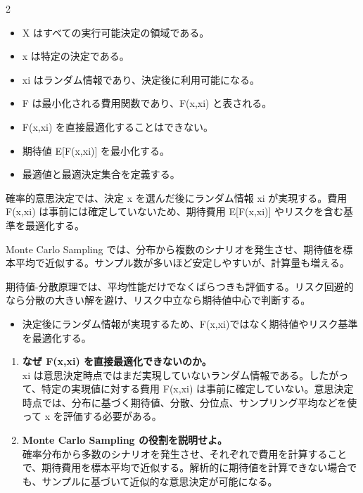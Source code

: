 \clearpage
{}
\begin{multicols}{2}\footnotesize\raggedcolumns
{}
\begin{itemize}
\item X はすべての実行可能決定の領域である。
\item x は特定の決定である。
\item xi はランダム情報であり、決定後に利用可能になる。
\item F は最小化される費用関数であり、F(x,xi) と表される。
\item F(x,xi) を直接最適化することはできない。
\item 期待値 E[F(x,xi)] を最小化する。
\item 最適値と最適決定集合を定義する。
\end{itemize}
確率的意思決定では、決定 x を選んだ後にランダム情報 xi が実現する。費用 F(x,xi) は事前には確定していないため、期待費用 E[F(x,xi)] やリスクを含む基準を最適化する。\par

Monte Carlo Sampling では、分布から複数のシナリオを発生させ、期待値を標本平均で近似する。サンプル数が多いほど安定しやすいが、計算量も増える。\par

期待値-分散原理では、平均性能だけでなくばらつきも評価する。リスク回避的なら分散の大きい解を避け、リスク中立なら期待値中心で判断する。\par
{}
\begin{itemize}
\item 決定後にランダム情報が実現するため、F(x,xi)ではなく期待値やリスク基準を最適化する。
\end{itemize}
\begin{enumerate}
\item \textbf{なぜ F(x,xi) を直接最適化できないのか。}\\xi は意思決定時点ではまだ実現していないランダム情報である。したがって、特定の実現値に対する費用 F(x,xi) は事前に確定していない。意思決定時点では、分布に基づく期待値、分散、分位点、サンプリング平均などを使って x を評価する必要がある。
\item \textbf{Monte Carlo Sampling の役割を説明せよ。}\\確率分布から多数のシナリオを発生させ、それぞれで費用を計算することで、期待費用を標本平均で近似する。解析的に期待値を計算できない場合でも、サンプルに基づいて近似的な意思決定が可能になる。
\end{enumerate}
\end{multicols}

